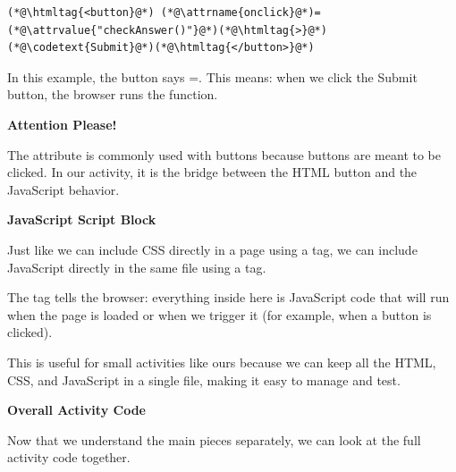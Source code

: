\documentclass{article}
\begin{document}
\vspace{0.1cm}

\begin{lstlisting}
(*@\htmltag{<button}@*) (*@\attrname{onclick}@*)=(*@\attrvalue{"checkAnswer()"}@*)(*@\htmltag{>}@*)(*@\codetext{Submit}@*)(*@\htmltag{</button>}@*)
\end{lstlisting}

\vspace{0.2cm}

In this example, the button says =.
This means: when we click the Submit button, the browser runs the  function.

\vspace{0.3cm}

\begin{attentionbox}
  \textbf{\Bitter\textcolor{naranja}{Attention Please!}}

  The  attribute is commonly used with buttons because buttons are meant to be clicked.
  In our activity, it is the bridge between the HTML button and the JavaScript behavior.
\end{attentionbox}

\vspace{0.4cm}

\textbf{\Bitter\textcolor{naranja}{JavaScript Script Block}}

\vspace{0.1cm}

Just like we can include CSS directly in a page using a  tag,
we can include JavaScript directly in the same file using a  tag.

The  tag tells the browser: everything inside here is JavaScript code
that will run when the page is loaded or when we trigger it (for example, when a button is clicked).

This is useful for small activities like ours because we can keep all the HTML, CSS, and
JavaScript in a single file, making it easy to manage and test.

\vspace{0.4cm}

\textbf{\Bitter\textcolor{naranja}{Overall Activity Code}}

\vspace{0.1cm}

Now that we understand the main pieces separately, we can look at the full activity code together.
\end{document}
